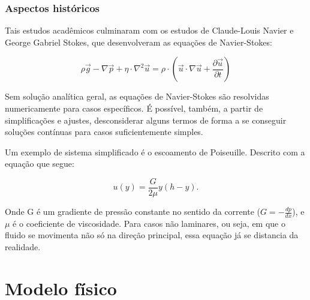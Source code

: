 \documentclass[xcolor=dvipsnames,10pt,aspectratio=169]{beamer}
\begin{document}
		\begin{frame}
      \frametitle{Aspectos históricos}
      Tais estudos acadêmicos culminaram com os estudos de  Claude-Louis Navier e George Gabriel Stokes, que desenvolveram as equações de Navier-Stokes:

      \begin{equation}
      \rho \vec{g}-\nabla \vec{p}+\eta \cdot \nabla^{2} \vec{u}=\rho \cdot\left(\vec{u} \cdot \nabla \vec{u}+\frac{\partial \vec{u}}{\partial t}\right)
      \end{equation}

      Sem solução analítica geral, as equações de Navier-Stokes são resolvidas numericamente para casos específicos. É possível, também, a partir de simplificações e ajustes, desconsiderar alguns termos de forma a se conseguir soluções contínuas para casos suficientemente simples.

      Um exemplo de sistema simplificado é o escoamento de Poiseuille. Descrito com a equação que segue:

      \begin{equation}
        u(y) = \frac{G}{2\mu}y (h - y).
      \end{equation}

      Onde G é um gradiente de pressão constante no sentido da corrente ($G = -\frac{dp}{dx}$), e $\mu$ é o coeficiente de viscosidade. Para casos não laminares, ou seja, em que o fluido se movimenta não só na direção principal, essa equação já se distancia da realidade.
		\end{frame}





	\section{Modelo físico}
	
	
	
	
	
\end{document}

